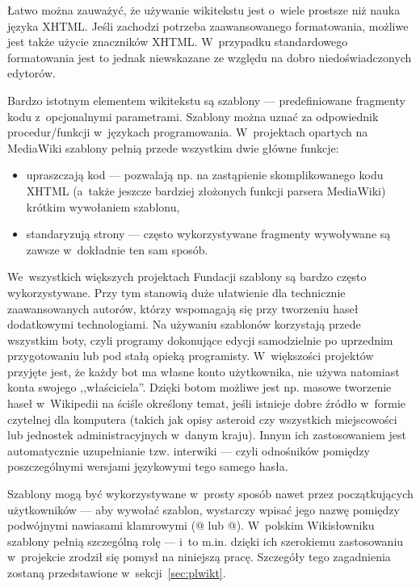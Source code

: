 Łatwo można zauważyć, że używanie wikitekstu jest o~wiele prostsze niż nauka języka XHTML. Jeśli zachodzi potrzeba zaawansowanego formatowania, możliwe jest także użycie znaczników XHTML. W~przypadku standardowego formatowania jest to jednak niewskazane ze względu na dobro niedoświadczonych edytorów.

Bardzo istotnym elementem wikitekstu są szablony --- predefiniowane fragmenty kodu z~opcjonalnymi parametrami. Szablony można uznać za odpowiednik procedur/funkcji w~językach programowania. W~projektach opartych na MediaWiki szablony pełnią przede wszystkim dwie główne funkcje:
\begin{itemize}
	\item upraszczają kod --- pozwalają np. na zastąpienie skomplikowanego kodu XHTML (a~także jeszcze bardziej złożonych funkcji parsera MediaWiki) krótkim wywołaniem szablonu,
	\item standaryzują strony --- często wykorzystywane fragmenty wywoływane są zawsze w~dokładnie ten sam sposób.
\end{itemize}
We~wszystkich większych projektach Fundacji szablony są bardzo często wykorzystywane. Przy tym stanowią duże ułatwienie dla technicznie zaawansowanych autorów, którzy wspomagają się przy tworzeniu haseł dodatkowymi technologiami. Na używaniu szablonów korzystają przede wszystkim boty, czyli programy dokonujące edycji samodzielnie po uprzednim przygotowaniu lub pod stałą opieką programisty. W~większości projektów przyjęte jest, że każdy bot ma własne konto użytkownika, nie używa natomiast konta swojego ,,właściciela''. Dzięki botom możliwe jest np. masowe tworzenie haseł w~Wikipedii na ściśle określony temat, jeśli istnieje dobre źródło w~formie czytelnej dla komputera (takich jak opisy asteroid czy wszystkich miejscowości lub jednostek administracyjnych w~danym kraju). Innym ich zastosowaniem jest automatycznie uzupełnianie tzw. interwiki --- czyli odnośników pomiędzy poszczególnymi wersjami językowymi tego samego hasła.

Szablony mogą być wykorzystywane w~prosty sposób nawet przez początkujących użytkowników --- aby wywołać szablon, wystarczy wpisać jego nazwę
 pomiędzy podwójnymi nawiasami klamrowymi (@ lub @). W~polskim Wikisłowniku szablony pełnią szczególną rolę --- i~to m.in. dzięki ich szerokiemu zastosowaniu w~projekcie zrodził się pomysł na niniejszą pracę. Szczegóły tego zagadnienia zostaną przedstawione w~sekcji~\ref{sec:plwikt}.

